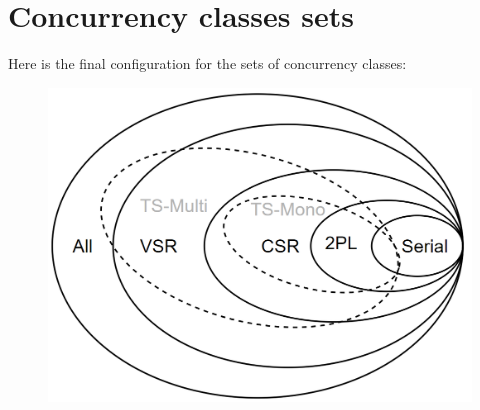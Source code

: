 \section{Concurrency classes sets}

Here is the final configuration for the sets of concurrency classes: 
\begin{figure}[H]
    \centering
    \includegraphics[width=0.75\linewidth]{images/set.png}
\end{figure}